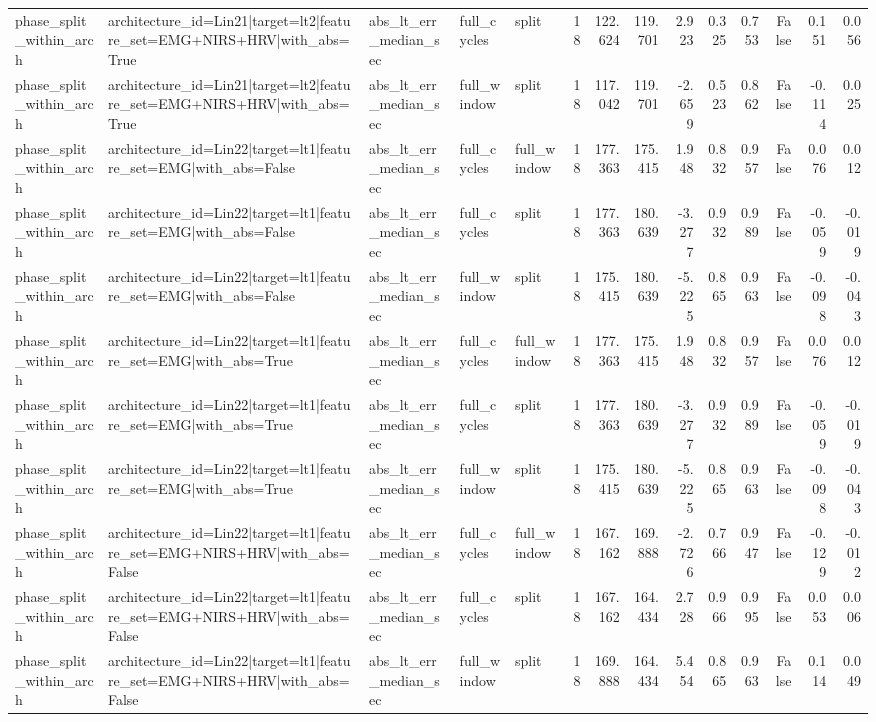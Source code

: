 \begin{table}
\begin{tabular}{lllllrrrrrrrrr}
phase_split_within_arch & architecture_id=Lin21|target=lt2|feature_set=EMG+NIRS+HRV|with_abs=True & abs_lt_err_median_sec & full_cycles & split & 18 & 122.624 & 119.701 & 2.923 & 0.325 & 0.753 & False & 0.151 & 0.056 \\
phase_split_within_arch & architecture_id=Lin21|target=lt2|feature_set=EMG+NIRS+HRV|with_abs=True & abs_lt_err_median_sec & full_window & split & 18 & 117.042 & 119.701 & -2.659 & 0.523 & 0.862 & False & -0.114 & 0.025 \\
phase_split_within_arch & architecture_id=Lin22|target=lt1|feature_set=EMG|with_abs=False & abs_lt_err_median_sec & full_cycles & full_window & 18 & 177.363 & 175.415 & 1.948 & 0.832 & 0.957 & False & 0.076 & 0.012 \\
phase_split_within_arch & architecture_id=Lin22|target=lt1|feature_set=EMG|with_abs=False & abs_lt_err_median_sec & full_cycles & split & 18 & 177.363 & 180.639 & -3.277 & 0.932 & 0.989 & False & -0.059 & -0.019 \\
phase_split_within_arch & architecture_id=Lin22|target=lt1|feature_set=EMG|with_abs=False & abs_lt_err_median_sec & full_window & split & 18 & 175.415 & 180.639 & -5.225 & 0.865 & 0.963 & False & -0.098 & -0.043 \\
phase_split_within_arch & architecture_id=Lin22|target=lt1|feature_set=EMG|with_abs=True & abs_lt_err_median_sec & full_cycles & full_window & 18 & 177.363 & 175.415 & 1.948 & 0.832 & 0.957 & False & 0.076 & 0.012 \\
phase_split_within_arch & architecture_id=Lin22|target=lt1|feature_set=EMG|with_abs=True & abs_lt_err_median_sec & full_cycles & split & 18 & 177.363 & 180.639 & -3.277 & 0.932 & 0.989 & False & -0.059 & -0.019 \\
phase_split_within_arch & architecture_id=Lin22|target=lt1|feature_set=EMG|with_abs=True & abs_lt_err_median_sec & full_window & split & 18 & 175.415 & 180.639 & -5.225 & 0.865 & 0.963 & False & -0.098 & -0.043 \\
phase_split_within_arch & architecture_id=Lin22|target=lt1|feature_set=EMG+NIRS+HRV|with_abs=False & abs_lt_err_median_sec & full_cycles & full_window & 18 & 167.162 & 169.888 & -2.726 & 0.766 & 0.947 & False & -0.129 & -0.012 \\
phase_split_within_arch & architecture_id=Lin22|target=lt1|feature_set=EMG+NIRS+HRV|with_abs=False & abs_lt_err_median_sec & full_cycles & split & 18 & 167.162 & 164.434 & 2.728 & 0.966 & 0.995 & False & 0.053 & 0.006 \\
phase_split_within_arch & architecture_id=Lin22|target=lt1|feature_set=EMG+NIRS+HRV|with_abs=False & abs_lt_err_median_sec & full_window & split & 18 & 169.888 & 164.434 & 5.454 & 0.865 & 0.963 & False & 0.114 & 0.049 \\

\end{tabular}
\end{table}

